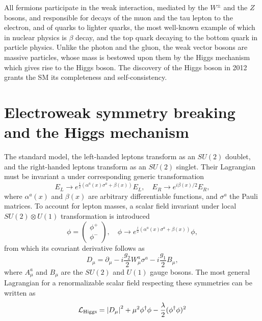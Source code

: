 All fermions participate in the weak interaction, mediated by the $W^{\pm}$ and the $Z$ bosons, and responsible for decays of the muon and the tau lepton to the electron, and of quarks to lighter quarks, the most well-known example of which in nuclear physics is $\beta$ decay, and the top quark decaying to the bottom quark in particle physics. 
Unlike the photon and the gluon, the weak vector bosons are massive particles, whose mass is bestowed upon them by the Higgs mechanism which gives rise to the Higgs boson. 
The discovery of the Higgs boson in 2012 grants the SM its completeness and self-consistency. 

\section{Electroweak symmetry breaking and the Higgs mechanism} \label{sect:Higgs-mechanism}
The standard model, the left-handed leptons transform as an $SU(2)$ doublet, and the right-handed leptons transform as an $SU(2)$ singlet. Their Lagrangian must be invariant a under corresponding generic transformation
\begin{equation}
    \label{eq:2.1}
    E_L \rightarrow e^{\frac{i}{2}\left( \alpha^a(x)\sigma^a + \beta(x) \right)}E_L, \quad E_R\rightarrow e^{i\beta(x)/2}E_R,
\end{equation}
where $\alpha^a(x)$ and $\beta(x)$ are arbitrary differentiable functions, and $\sigma^a$ the Pauli matrices. To account for lepton masses, a scalar field invariant under local $SU(2)\otimes U(1)$ transformation is introduced
\begin{equation}
    \label{eq:2.2}
    \phi=\begin{pmatrix}
        \phi^+ \\ \phi^-
    \end{pmatrix}, \quad \phi\rightarrow e^{\frac{i}{2}\left( \alpha^a(x)\sigma^a + \beta(x) \right)} \phi,
\end{equation}
from which its covariant derivative follows as
\begin{equation}
    \label{eq:2.3}
    D_{\mu} = \partial_{\mu} - i \frac{g_2}{2}W^a_{\mu} \sigma^a - i\frac{g_1}{2}B_{\mu},
\end{equation}
where $A^{a}_{\mu}$ and $B_{\mu}$ are the $SU(2)$ and $U(1)$ gauge bosons. The most general Lagrangian for a renormalizable scalar field respecting these symmetries can be written as
\begin{equation}
    \label{eq:2.4}
    \mathcal{L}_{\mathrm{Higgs}} = \abs{D_{\mu}}^2 + \mu^2\phi^{\dagger}\phi - \frac{\lambda}{2} (\phi^{\dagger}\phi)^2
\end{equation}
